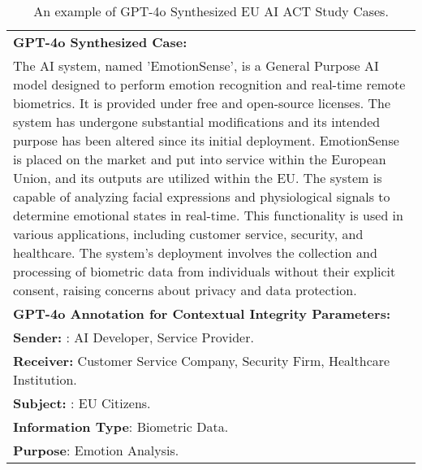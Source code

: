 \begin{table*}[t]
\begin{tabular}{p{}}
\textbf{GPT-4o Synthesized Case: }\\
The AI system, named 'EmotionSense', is a General Purpose AI model designed to perform emotion recognition and real-time remote biometrics. It is provided under free and open-source licenses. The system has undergone substantial modifications and its intended purpose has been altered since its initial deployment. EmotionSense is placed on the market and put into service within the European Union, and its outputs are utilized within the EU. The system is capable of analyzing facial expressions and physiological signals to determine emotional states in real-time. This functionality is used in various applications, including customer service, security, and healthcare. The system's deployment involves the collection and processing of biometric data from individuals without their explicit consent, raising concerns about privacy and data protection.\\
\midrule
\textbf{GPT-4o Annotation for Contextual Integrity Parameters:} \\
\textbf{Sender: }: AI Developer, Service Provider. \\
\textbf{Receiver: } Customer Service Company, Security Firm, Healthcare Institution. \\
\textbf{Subject: }: EU Citizens. \\
\textbf{Information Type}: Biometric Data. \\
\textbf{Purpose}: Emotion Analysis. \\

\bottomrule
\end{tabular}
\vspace{-0.1in}
\caption{An example of GPT-4o Synthesized EU AI ACT Study Cases.}
\label{tabs:synthesized_ai_act_case}
\vspace{-0.1in}
\end{table*}